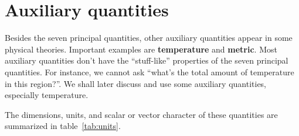 \documentclass[a4paper,12pt,%
onecolumn,oneside,titlepage,%
british%
]{memoir}
\renewcommand*{\|}[1][]{\nonscript\:#1\vert\nonscript\:\mathopen{}}
\begin{document}
\section{Auxiliary quantities}
\label{sec:aux_quantities}

Besides the seven principal quantities, other auxiliary quantities appear in some physical theories. Important examples are \textbf{temperature} and \textbf{metric}. Most auxiliary quantities don't have the \enquote{stuff-like} properties of the seven principal quantities. For instance, we cannot ask \enquote{what's the total amount of temperature in this region?}. We shall later discuss and use some auxiliary quantities, especially temperature.


The dimensions, units, and scalar or vector character of these quantities are summarized in table~\ref{tab:units}.
\end{document}

